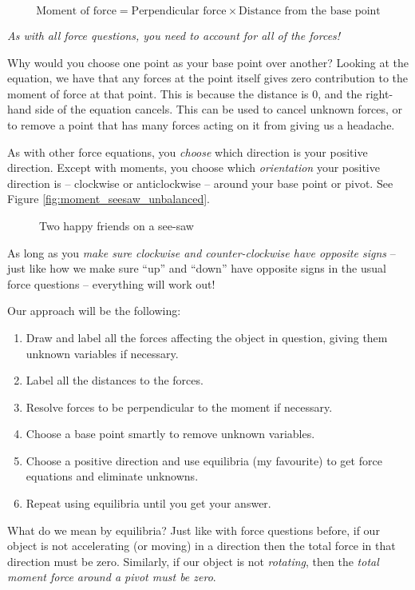 \[ \text{Moment of force} = \text{Perpendicular force}\times \text{Distance from the base point}\] 

\emph{As with all force questions, you need to account for all of the forces!}

Why would you choose one point as your base point over another? Looking at the equation, we have that any forces at the point itself gives zero contribution to the moment of force at that point. This is 
because the distance is $0$, and the right-hand side of the equation cancels. This can be used to cancel unknown forces, or to remove a point that has many forces acting on it from giving us a headache.

As with other force equations, you \emph{choose} which direction is your positive direction. Except with moments, you choose which \emph{orientation} your positive direction is -- clockwise or anticlockwise -- around your base point or pivot. See Figure \ref{fig:moment_seesaw_unbalanced}.

\begin{figure}[H]
    \centering
    \caption{Two happy friends on a see-saw}
    \label{fig:moment_seesaw}
\end{figure}

As long as you \emph{make sure clockwise and counter-clockwise have opposite signs} -- just like how we make sure ``up'' and ``down'' have opposite signs in the usual force questions -- everything will work out!

Our approach will be the following:

\begin{enumerate}
    \item Draw and label all the forces affecting the object in question, giving them unknown variables if necessary.
    \item Label all the distances to the forces.
    \item Resolve forces to be perpendicular to the moment if necessary.
    \item Choose a base point smartly to remove unknown variables.
    \item Choose a positive direction and use equilibria (my favourite) to get force equations and eliminate unknowns.
    \item Repeat using equilibria until you get your answer.
\end{enumerate}

What do we mean by equilibria? Just like with force questions before, if our object is not accelerating (or moving) in a direction then the total force in that direction must be zero.
Similarly, if our object is not \emph{rotating}, then the \emph{total moment force around a pivot must be zero}. 

